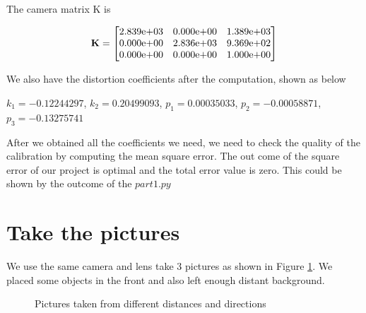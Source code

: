 \documentclass[10pt,twocolumn,letterpaper]{article}
\begin{document}
The camera matrix K is 

$$\textbf{K} =
\begin{bmatrix}
2.839{\text e+}03&0.000{\text e+}00&1.389{\text e+}03\\
0.000{\text e+}00&2.836{\text e+}03&9.369{\text e+}02\\
0.000{\text e+}00&0.000{\text e+}00&1.000{\text e+}00 
\end{bmatrix}
$$

We also have the distortion coefficients after the computation, shown as below

$k_{1} = -0.12244297$, $k_{2} = 0.20499093$, $p_{1} = 0.00035033$, $p_{2} = -0.00058871$, $p_{3} = -0.13275741$

After we obtained all the coefficients we need, we need to check the quality of the calibration by computing the mean square error. The out come of the square error of our project is optimal and the total error value is zero. This could be shown by the outcome of the $part1.py$


\section{Take the pictures}

We use the same camera and lens take 3 pictures as shown in Figure \ref{fig:pictures}. We placed some objects in the front and also left enough distant background.
\begin{figure}[t]
\centering
{}

\caption{Pictures taken from different distances and directions}
\label{fig:pictures}
\end{figure}
\end{document}
